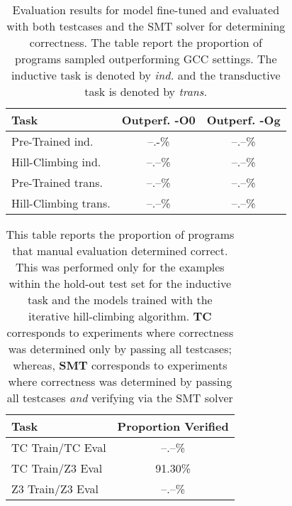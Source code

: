 \documentclass{article}
\begin{document}
\begin{table}[t]
\caption{Evaluation results for model fine-tuned and evaluated with both testcases and the SMT solver for determining correctness. The table report the proportion of programs sampled outperforming GCC settings. The inductive task is denoted by \textit{ind.} and the transductive task is denoted by \textit{trans.}}
\label{tab:z3_inner_loop_results}
\vskip 0.15in
\begin{center}
\begin{small}
\begin{sc}
\begin{tabular}{lcc}
\toprule
Task & Outperf. -O0 & Outperf. -Og \\
\midrule
Pre-Trained ind.    & --.-\% & --.--\% \\
Hill-Climbing ind.  & --.--\% & --.--\% \\
Pre-Trained trans.   & --.--\% & --.--\% \\
Hill-Climbing trans.  & --.--\% & --.--\% \\
\bottomrule
\end{tabular}
\end{sc}
\end{small}
\end{center}
\vskip -0.1in
\end{table}


\begin{table}[t]
\caption{This table reports the proportion of programs that manual evaluation determined correct. This was performed only for the examples within the hold-out test set for the inductive task and the models trained with the iterative hill-climbing algorithm.  \textbf{TC} corresponds to experiments where correctness was determined only by passing all testcases; whereas, \textbf{SMT} corresponds to experiments where correctness was determined by passing all testcases \textit{and} verifying via the SMT solver}
\label{tab:manual}
\vskip 0.15in
\begin{center}
\begin{small}
\begin{sc}
\begin{tabular}{lc}
\toprule
Task & Proportion Verified \\
\midrule
TC Train/TC Eval  & --.--\%\\
TC Train/Z3 Eval   & 91.30\%\\
Z3 Train/Z3 Eval  & --.--\%\\
\bottomrule
\end{tabular}
\end{sc}
\end{small}
\end{center}
\vskip -0.1in
\end{table}
\end{document}

